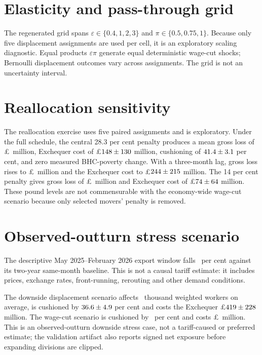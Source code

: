 \appendix
\renewcommand{\thesection}{S\arabic{section}}

\section{Elasticity and pass-through grid}\label{supp:grid}

The regenerated grid spans $\varepsilon\in\{0.4,1,2,3\}$ and $\pi\in\{0.5,0.75,1\}$. Because only five displacement assignments are used per cell, it is an exploratory scaling diagnostic. Equal products $\varepsilon\pi$ generate equal deterministic wage-cut shocks; Bernoulli displacement outcomes vary across assignments. The grid is not an uncertainty interval.

\section{Reallocation sensitivity}\label{supp:reallocation}

The reallocation exercise uses five paired assignments and is exploratory.
Under the full schedule, the central 28.3 per cent penalty produces a mean
gross loss of \pounds\ReallocCentralGross\ million, Exchequer cost of
\pounds $148\pm130$ million,
cushioning of $41.4\pm3.1$ per cent,
and zero measured BHC-poverty change. With a three-month lag, gross loss
rises to \pounds\ReallocLagGross\ million and the Exchequer cost to
\pounds $244\pm215$ million. The 14 per
cent penalty gives gross loss of \pounds\ReallocLowPenaltyGross\ million and
Exchequer cost of
\pounds $74\pm64$
million. These pound levels are not commensurable with
the economy-wide wage-cut scenario because only selected movers' penalty is
removed.

\section{Observed-outturn stress scenario}\label{supp:measured}

The descriptive May 2025--February 2026 export window falls
\RealisedAggregateFall\ per cent against its two-year same-month baseline.
This is not a causal tariff estimate: it includes prices, exchange rates,
front-running, rerouting and other demand conditions.

The downside displacement scenario affects \MeasuredDisplacedWorkers\ thousand
weighted workers on average, is cushioned by
$36.6\pm4.9$ per cent and costs
the Exchequer
\pounds $419\pm228$ million.
The wage-cut scenario is cushioned by \MeasuredWageCushion\ per cent and costs
\pounds\MeasuredWageExchequer\ million. This is an observed-outturn downside
stress case, not a tariff-caused or preferred estimate; the validation
artifact also reports signed net exposure before expanding divisions are
clipped.


